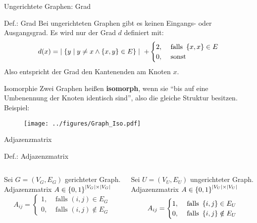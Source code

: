 \begin{frame}{Ungerichtete Graphen: Grad}
	\begin{block}{Def.: Grad}
		Bei ungerichteten Graphen gibt es keinen Eingangs- oder Ausgangsgrad. Es wird nur der Grad $d$ definiert mit:
		\[
			d(x)=\; \mid \left\{ y \mid y \neq x \wedge \left\{ x,y \right\}\in E \right\} \mid \; + 
			\begin{cases} 
				2, & \text{ falls } \left\{ x,x \right\} \in E \\
				0, & \text{ sonst}
			\end{cases}
		\]
		\medskip
		Also entspricht der Grad den Kantenenden am Knoten $x$.
	\end{block}
\end{frame}


\begin{frame}{Isomorphie}
	Zwei Graphen heißen \textbf{isomorph}, wenn sie \enquote{bis auf eine Umbenennung der Knoten identisch sind}, also die gleiche Struktur besitzen.\\

	Beispiel:
	\begin{figure}[H]
		\texttt{[image: ../figures/Graph\_Iso.pdf]}
	\end{figure}
\end{frame}

\begin{frame}{Adjazenzmatrix}
	\begin{block}{Def.: Adjazenzmatrix}
		\begin{columns}
			\begin{column}{0.475\textwidth}
				Sei $G=(V_G,E_G)$ gerichteter Graph.\\
				Adjazenzmatrix $A \in \left\{ 0,1 \right\}^{\mid V_G \mid \times \mid V_G \mid}$\\[12pt]
				\[
					A_{ij} = 
					\begin{cases}
						1, & \text{ falls } (i,j)\in E_G\\
						0, & \text{ falls } (i,j)\notin E_G
					\end{cases}
				\]
			\end{column}
			\begin{column}{0.475\textwidth}
				Sei $U=(V_U,E_U)$ ungerichteter Graph.\\
				Adjazenzmatrix $A \in \left\{ 0,1 \right\}^{\mid V_U \mid \times \mid V_U \mid}$\\[12pt]
				\[
					A_{ij} = 
					\begin{cases}
						1, & \text{ falls } \left\{ i,j \right\}\in E_U\\
						0, & \text{ falls } \left\{ i,j \right\}\notin E_U
					\end{cases}
				\]
			\end{column}
		\end{columns}
	\end{block}
\end{frame}

